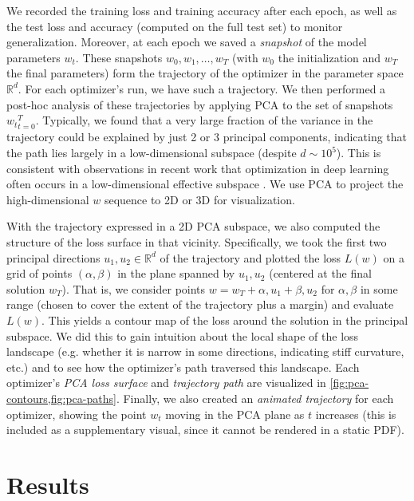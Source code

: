 \documentclass[12pt]{article}
\begin{document}
We recorded the training loss and training accuracy after each epoch, as well as the test loss and accuracy (computed on the full test set) to monitor generalization. Moreover, at each epoch we saved a \emph{snapshot} of the model parameters $w_t$. These snapshots ${w_0, w_1, \dots, w_T}$ (with $w_0$ the initialization and $w_T$ the final parameters) form the trajectory of the optimizer in the parameter space $\mathbb{R}^d$. For each optimizer’s run, we have such a trajectory. We then performed a post-hoc analysis of these trajectories by applying PCA to the set of snapshots ${w_t}_{t=0}^T$. Typically, we found that a very large fraction of the variance in the trajectory could be explained by just 2 or 3 principal components, indicating that the path lies largely in a low-dimensional subspace (despite $d \sim 10^5$). This is consistent with observations in recent work that optimization in deep learning often occurs in a low-dimensional effective subspace \cite{Li2018visualizing}. We use PCA to project the high-dimensional $w$ sequence to 2D or 3D for visualization.

With the trajectory expressed in a 2D PCA subspace, we also computed the structure of the loss surface in that vicinity. Specifically, we took the first two principal directions $u_1, u_2 \in \mathbb{R}^d$ of the trajectory and plotted the loss $L(w)$ on a grid of points $(\alpha, \beta)$ in the plane spanned by $u_1, u_2$ (centered at the final solution $w_T$). That is, we consider points $w = w_T + \alpha, u_1 + \beta, u_2$ for $\alpha, \beta$ in some range (chosen to cover the extent of the trajectory plus a margin) and evaluate $L(w)$. This yields a contour map of the loss around the solution in the principal subspace. We did this to gain intuition about the local shape of the loss landscape (e.g. whether it is narrow in some directions, indicating stiff curvature, etc.) and to see how the optimizer’s path traversed this landscape. Each optimizer’s \textit{PCA loss surface} and \textit{trajectory path} are visualized in \cref{fig:pca-contours,fig:pca-paths}. Finally, we also created an \textit{animated trajectory} for each optimizer, showing the point $w_t$ moving in the PCA plane as $t$ increases (this is included as a supplementary visual, since it cannot be rendered in a static PDF).

\section{Results} \label{results}
\end{document}
